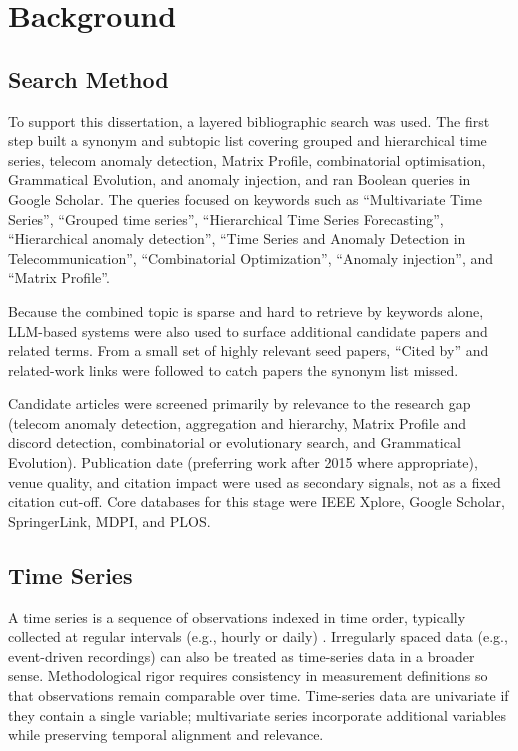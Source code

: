 \chapter{Background}

\section{Search Method}

To support this dissertation, a layered bibliographic search was used.
The first step built a synonym and subtopic list covering grouped and hierarchical time series, telecom anomaly detection, Matrix Profile, combinatorial optimisation, Grammatical Evolution, and anomaly injection, and ran Boolean queries in Google Scholar.
The queries focused on keywords such as ``Multivariate Time Series'', ``Grouped time series'', ``Hierarchical Time Series Forecasting'', ``Hierarchical anomaly detection'', ``Time Series and Anomaly Detection in Telecommunication'', ``Combinatorial Optimization'', ``Anomaly injection'', and ``Matrix Profile''.

Because the combined topic is sparse and hard to retrieve by keywords alone, LLM-based systems were also used to surface additional candidate papers and related terms.
From a small set of highly relevant seed papers, ``Cited by'' and related-work links were followed to catch papers the synonym list missed.

Candidate articles were screened primarily by relevance to the research gap (telecom anomaly detection, aggregation and hierarchy, Matrix Profile and discord detection, combinatorial or evolutionary search, and Grammatical Evolution).
Publication date (preferring work after 2015 where appropriate), venue quality, and citation impact were used as secondary signals, not as a fixed citation cut-off.
Core databases for this stage were IEEE Xplore, Google Scholar, SpringerLink, MDPI, and PLOS.

\section{Time Series}

A time series is a sequence of observations indexed in time order, typically collected at regular intervals (e.g., hourly or daily) \parencite{box2015}.
Irregularly spaced data (e.g., event-driven recordings) can also be treated as time-series data in a broader sense.
Methodological rigor requires consistency in measurement definitions so that observations remain comparable over time.
Time-series data are univariate if they contain a single variable; multivariate series incorporate additional variables while preserving temporal alignment and relevance.

